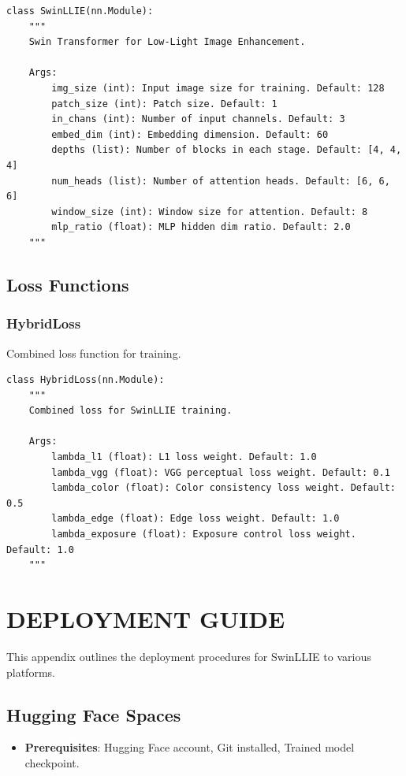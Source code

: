 \documentclass[12pt, a4paper]{report}
\begin{document}
\begin{verbatim}
class SwinLLIE(nn.Module):
    """
    Swin Transformer for Low-Light Image Enhancement.
    
    Args:
        img_size (int): Input image size for training. Default: 128
        patch_size (int): Patch size. Default: 1
        in_chans (int): Number of input channels. Default: 3
        embed_dim (int): Embedding dimension. Default: 60
        depths (list): Number of blocks in each stage. Default: [4, 4, 4]
        num_heads (list): Number of attention heads. Default: [6, 6, 6]
        window_size (int): Window size for attention. Default: 8
        mlp_ratio (float): MLP hidden dim ratio. Default: 2.0
    """
\end{verbatim}

\subsection{Loss Functions}
\subsubsection{HybridLoss}
Combined loss function for training.
\begin{verbatim}
class HybridLoss(nn.Module):
    """
    Combined loss for SwinLLIE training.
    
    Args:
        lambda_l1 (float): L1 loss weight. Default: 1.0
        lambda_vgg (float): VGG perceptual loss weight. Default: 0.1
        lambda_color (float): Color consistency loss weight. Default: 0.5
        lambda_edge (float): Edge loss weight. Default: 1.0
        lambda_exposure (float): Exposure control loss weight. Default: 1.0
    """
\end{verbatim}

\section{DEPLOYMENT GUIDE}
This appendix outlines the deployment procedures for SwinLLIE to various platforms.

\subsection{Hugging Face Spaces}
\begin{itemize}
    \item \textbf{Prerequisites}: Hugging Face account, Git installed, Trained model checkpoint.
\end{itemize}
\end{document}
